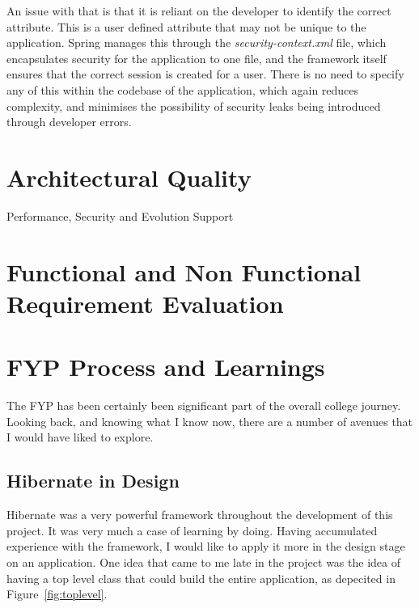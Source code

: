 An issue with that is that it is reliant on the developer to identify the correct attribute. This is a user defined attribute that may not be unique to the application. Spring manages this through the \textit{security-context.xml} file, which encapsulates security for the application to one file, and the framework itself ensures that the correct session is created for a user. There is no need to specify any of this within the codebase of the application, which again reduces complexity, and minimises the possibility of security leaks being introduced through developer errors.

\section{Architectural Quality}



Performance, Security and Evolution Support

\section{Functional and Non Functional Requirement Evaluation}

\section{FYP Process and Learnings}

The FYP has been certainly been significant part of the overall college journey. Looking back, and knowing what I know now, there are a number of avenues that I would have liked to explore.

\subsection{Hibernate in Design}
Hibernate was a very powerful framework throughout the development of this project. It was very much a case of learning by doing. Having accumulated experience with the framework, I would like to apply it more in the design stage on an application. One idea that came to me late in the project was the idea of having a top level class that could build the entire application, as depecited in Figure~\ref{fig:toplevel}.

